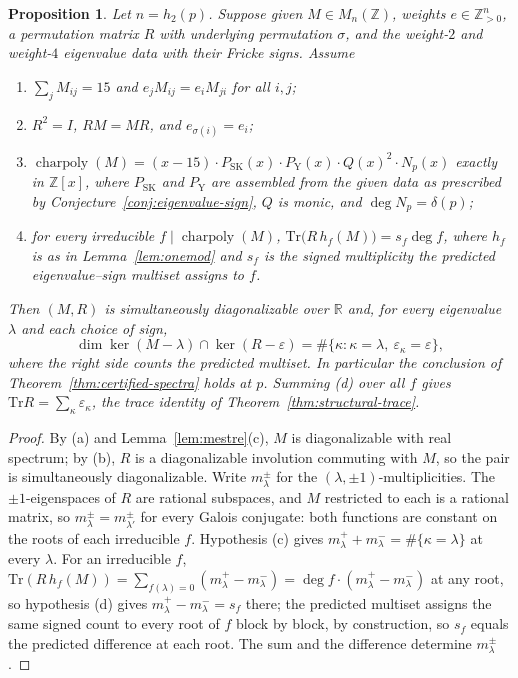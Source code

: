 \documentclass[10pt,a4paper]{amsart}
\newtheorem{proposition}[theorem]{Proposition}
\newcommand{\Z}{\mathbb{Z}}
\newcommand{\R}{\mathbb{R}}
\newcommand{\Tr}{\mathrm{Tr}}
\newcommand{\eps}{\varepsilon}
\DeclareMathOperator{\charp}{charpoly}
\providecommand{\charp}{\operatorname{charpoly}}
\begin{document}
	\begin{proposition}	\label{prop:reduction}
		Let $n=h_2(p)$. Suppose given $M\in M_n(\Z)$, weights $e\in\Z_{>0}^n$, a
		permutation matrix $R$ with underlying permutation $\sigma$, and the
		weight-$2$ and weight-$4$ eigenvalue data with their Fricke signs. Assume
		\begin{enumerate}[label=\textup{(\alph*)},leftmargin=2.4em]
			\item $\sum_jM_{ij}=15$ and $e_jM_{ij}=e_iM_{ji}$ for all $i,j$;
			\item $R^2=I$, $RM=MR$, and $e_{\sigma(i)}=e_i$;
			\item $\charp(M)=(x-15)\cdot P_{\mathrm{SK}}(x)\cdot
			P_{\mathrm{Y}}(x)\cdot Q(x)^2\cdot N_p(x)$ exactly in $\Z[x]$, where
			$P_{\mathrm{SK}}$ and $P_{\mathrm{Y}}$ are assembled from the given data
			as prescribed by Conjecture~\ref{conj:eigenvalue-sign}, $Q$ is monic, and
			$\deg N_p=\delta(p)$;
			\item for every irreducible $f\mid\charp(M)$,
			$\Tr\bigl(R\,h_f(M)\bigr)=s_f\deg f$, where $h_f$ is as in
			Lemma~\ref{lem:onemod} and $s_f$ is the signed multiplicity the predicted
			eigenvalue--sign multiset assigns to $f$.
		\end{enumerate}
		Then $(M,R)$ is simultaneously diagonalizable over $\R$ and, for every
		eigenvalue $\lambda$ and each choice of sign,
		\[
		\dim\ker(M-\lambda)\cap\ker(R-\eps)
		=\#\{\kappa:\kappa=\lambda,\ \eps_\kappa=\eps\},
		\]
		where the right side counts the predicted multiset. In particular the
		conclusion of Theorem~\ref{thm:certified-spectra} holds at $p$. Summing
		\textup{(d)} over all $f$ gives $\Tr R=\sum_\kappa\eps_\kappa$, the trace
		identity of Theorem~\ref{thm:structural-trace}.
	\end{proposition}
	
	\begin{proof}
		By \textup{(a)} and Lemma~\ref{lem:mestre}(c), $M$ is diagonalizable with
		real spectrum; by \textup{(b)}, $R$ is a diagonalizable involution
		commuting with $M$, so the pair is simultaneously diagonalizable. Write
		$m_\lambda^\pm$ for the $(\lambda,\pm1)$-multiplicities. The
		$\pm1$-eigenspaces of $R$ are rational subspaces, and $M$ restricted to
		each is a rational matrix, so $m_\lambda^\pm=m_{\lambda'}^\pm$ for every
		Galois conjugate: both functions are constant on the roots of each
		irreducible $f$. Hypothesis \textup{(c)} gives
		$m_\lambda^++m_\lambda^-=\#\{\kappa=\lambda\}$ at every $\lambda$. For an
		irreducible $f$, $\Tr(R\,h_f(M))=\sum_{f(\lambda)=0}(m_\lambda^+-m_\lambda^-)
		=\deg f\cdot(m_\lambda^+-m_\lambda^-)$ at any root, so hypothesis
		\textup{(d)} gives $m_\lambda^+-m_\lambda^-=s_f$ there; the predicted
		multiset assigns the same signed count to every root of $f$ block by
		block, by construction, so $s_f$ equals the predicted difference at each
		root. The sum and the difference determine $m_\lambda^\pm$.
	\end{proof}
	
\end{document}
